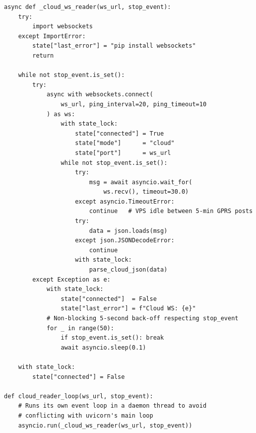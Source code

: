\begin{lstlisting}[caption={Cloud VPS WebSocket reader (asyncio)}, label={lst:py-cloud}]
async def _cloud_ws_reader(ws_url, stop_event):
    try:
        import websockets
    except ImportError:
        state["last_error"] = "pip install websockets"
        return

    while not stop_event.is_set():
        try:
            async with websockets.connect(
                ws_url, ping_interval=20, ping_timeout=10
            ) as ws:
                with state_lock:
                    state["connected"] = True
                    state["mode"]      = "cloud"
                    state["port"]      = ws_url
                while not stop_event.is_set():
                    try:
                        msg = await asyncio.wait_for(
                            ws.recv(), timeout=30.0)
                    except asyncio.TimeoutError:
                        continue   # VPS idle between 5-min GPRS posts
                    try:
                        data = json.loads(msg)
                    except json.JSONDecodeError:
                        continue
                    with state_lock:
                        parse_cloud_json(data)
        except Exception as e:
            with state_lock:
                state["connected"]  = False
                state["last_error"] = f"Cloud WS: {e}"
            # Non-blocking 5-second back-off respecting stop_event
            for _ in range(50):
                if stop_event.is_set(): break
                await asyncio.sleep(0.1)

    with state_lock:
        state["connected"] = False

def cloud_reader_loop(ws_url, stop_event):
    # Runs its own event loop in a daemon thread to avoid
    # conflicting with uvicorn's main loop
    asyncio.run(_cloud_ws_reader(ws_url, stop_event))
\end{lstlisting}

